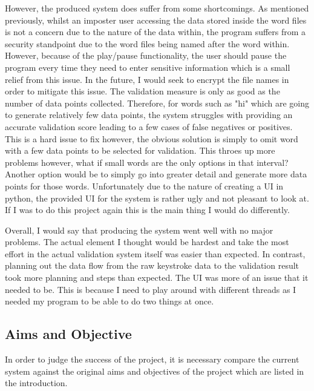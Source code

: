 \documentclass[10pt,a4paper]{report}
\begin{document}
However, the produced system does suffer from some shortcomings. As mentioned previously, whilst an imposter user accessing the data stored inside the word files is not a concern due to the nature of the data within, the program suffers from a security standpoint due to the word files being named after the word within. However, because of the play/pause functionality, the user should pause the program every time they need to enter sensitive information which is a small relief from this issue. In the future, I would seek to encrypt the file names in order to mitigate this issue. The validation measure is only as good as the number of data points collected. Therefore, for words such as "hi" which are going to generate relatively few data points, the system struggles with providing an accurate validation score leading to a few cases of false negatives or positives. This is a hard issue to fix however, the obvious solution is simply to omit word with a few data points to be selected for validation. This throes up more problems however, what if small words are the only options in that interval? Another option would be to simply go into greater detail and generate more data points for those words. Unfortunately due to the nature of creating a UI in python, the provided UI for the system is rather ugly and not pleasant to look at. If I was to do this project again this is the main thing I would do differently.

Overall, I would say that producing the system went well with no major problems. The actual element I thought would be hardest and take the most effort in the actual validation system itself was easier than expected. In contrast, planning out the data flow from the raw keystroke data to the validation result took more planning and steps than expected. The UI was more of an issue that it needed to be. This is because  I need to play around with different threads as I needed my program to be able to do two things at once. 

\subsection{Aims and Objective}

In order to judge the success of the project, it is necessary compare the current system against the original aims and objectives of the project which are listed in the introduction.
\end{document}
